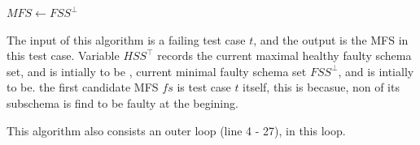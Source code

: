 \documentclass{sig-alternate-05-2015}
\begin{document}
{{\begin{algorithm}
\begin{algorithmic}[1]
    \EndWhile
     \State $MFS \leftarrow  FSS^{\bot}$
  \end{algorithmic}
\end{algorithm}

The input of this algorithm is a failing test case $t$, and the output is the MFS in this test case. Variable $HSS^{\top}$ records the current maximal healthy faulty schema set, and is intially to be ,  current minimal faulty schema set $FSS^{\bot}$, and is intially to be. the first candidate MFS $fs$ is test case $t$ itself, this is becasue, non of its subschema is find to be faulty at the begining. 

This algorithm also consists an outer loop (line 4 - 27), in this loop.


%
%
}}
\end{document}
